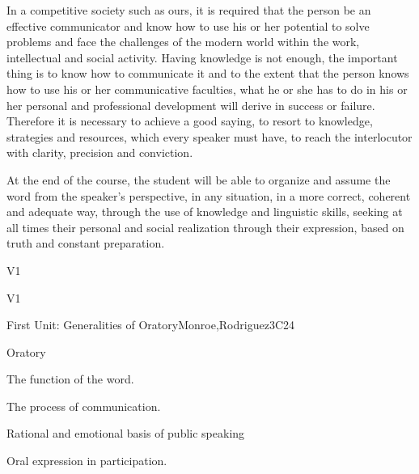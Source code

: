 \begin{syllabus}


\begin{justification}
	In a competitive society such as ours, it is required that the person be an effective communicator and know how to use his or her potential to solve problems and face the challenges of the modern world within the work, intellectual and social activity. Having knowledge is not enough, the important thing is to know how to communicate it and to the extent that the person knows how to use his or her communicative faculties, what he or she has to do in his or her personal and professional development will derive in success or failure. Therefore it is necessary to achieve a good saying, to resort to knowledge, strategies and resources, which every speaker must have, to reach the interlocutor with clarity, precision and conviction.
\end{justification}

\begin{goals}
\item At the end of the course, the student will be able to organize and assume the word from the speaker's perspective, in any situation, in a more correct, coherent and adequate way, through the use of knowledge and linguistic skills, seeking at all times their personal and social realization through their expression, based on truth and constant preparation.
\end{goals}

\begin{outcomes}{V1}
    \item {}
    \item {}
    \item {}
\end{outcomes}

\begin{competences}{V1}
    \item {}
    \item {}
\end{competences}

\begin{unit}{}{First Unit: Generalities of Oratory}{Monroe,Rodriguez}{3}{C24}
\begin{topics}
	\item Oratory
	\item The function of the word.
	\item The process of communication.
	\item Rational and emotional basis of public speaking
		\begin{subtopics}
			\item Oral expression in participation.
		\end{subtopics}


\end{topics}
\end{unit}
\end{syllabus}

